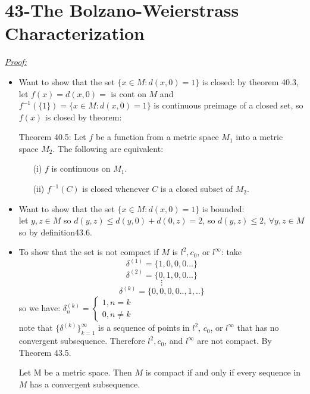 \documentclass{amsbook}
\begin{document}
\section{43-The Bolzano-Weierstrass Characterization}

\begin{tcolorbox}[enhanced,attach boxed title to top center={yshift=-3mm,yshifttext=-1mm},
  colback=blue!5!white,colframe=blue!75!black,colbacktitle=red!80!black,
  title=Exercise 43.1:,fonttitle=\bfseries,
  boxed title style={size=small,colframe=red!50!black} ]
     \textit{\color{blue}\underline{Proof:}}
     \begin{itemize}
\item Want to show that the set $\{x\in M:d(x,0)=1\}$ is closed: by theorem 40.3, let $f(x)=d(x,0)=$ is cont on 
$M$ and $f^{-1}(\{1\})=\{x\in M:d(x,0)=1\}$
is continuous preimage of a closed set, so $f(x)$ is closed by theorem:
 \begin{tcolorbox}[colback=red!5!white,colframe=red!75!black]
 Theorem 40.5: Let $f$ be a function from a metric space $M_1$
into a metric space $M_2$.
The following are equivalent:
\begin{enumerate}
    \item[(i)] $f$ is continuous on $M_1$.
    \item[(ii)] $f^{-1}(C)$ is closed whenever $C$ is a closed subset of $M_2$.
\end{enumerate}
\end{tcolorbox}
\item Want to show that the set $\{x\in M:d(x,0)=1\}$ is bounded:\\
let $y,z\in M$ so $d(y,z)\leq d(y,0)+d(0,z)=2$, so $d(y,z)\leq 2$, $\forall y,z\in M$ so by definition43.6.
\item To show that the set is not compact if $M$ is $l^2,c_0$, or $l^\infty$:
take $$\delta^{(1)}=\{1,0,0,0...\}$$
$$\delta^{(2)}=\{0,1,0,0...\}$$
$$\vdots$$
$$\delta^{(k)}=\{0,0,0,0..,1,..\}$$
so we have: $\delta^{(k)}_n=
\begin{cases} 
    1 ,n=k\\
0 ,n\neq k 
   \end{cases}$\\
   note that $\{\delta^{(k)}\}^{\infty}_{k=1}$ is a sequence of points in $l^2$, $c_0$, or $l^\infty$ that has 
   no convergent subsequence.
Therefore $l^2, c_0$, and $l^\infty$ are not compact. By Theorem 43.5.
\begin{tcolorbox}[colback=red!5!white,colframe=red!75!black]
Let M be a metric space. Then $M$ is compact if and only if every sequence in $M$ has a convergent subsequence.
\end{tcolorbox}
    \end{itemize}
\end{tcolorbox}
\end{document}
